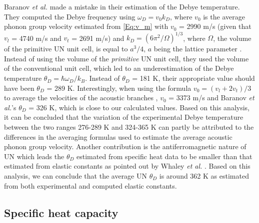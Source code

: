 \documentclass[preprint, 12pt]{elsarticle}
\begin{document}
Baranov \textit{et al.} \cite{Baranov2013} made a mistake in their estimation of the Debye temperature. They computed the Debye frequency using $\omega_D = v_0 k_D$, where $v_0$ is the average phonon group velocity estimated from \cref{Eq:v_m}  with $v_0$ = 2990 m/s (given that $v_l$ = 4740 m/s and $v_t$ = 2691 m/s) and $k_D = \left( 6 \pi^2 / \Omega \right)^{1/3}$, where $\Omega$, the volume of the primitive UN unit cell, is equal to $a^3/4$, $a$ being the lattice parameter \cite{Sellan2010}. Instead of using the volume of the \textit{primitive} UN unit cell, they used the volume of the conventional unit cell, which led to an underestimation of the Debye temperature $\theta_D = \hbar \omega_D / k_B$. Instead of $\theta_D$ = 181 K, their appropriate value should have been $\theta_D$ = 289 K. Interestingly, when using the formula $v_0 = \left( v_l + 2 v_t \right)/3$ to average the velocities of the acoustic branches \cite{Sellan2010}, $v_0$ = 3373 m/s and Baranov \textit{et al.}'s $\theta_D$ = 326 K, which is close to our calculated values. Based on this analysis, it can be concluded that the variation of the experimental Debye temperature between the two ranges 276-289 K and 324-365 K can partly be attributed to the differences in the averaging formulas used to estimate the average acoustic phonon group velocity. Another contribution is the antiferromagnetic nature of UN which leads the $\theta_D$ estimated from specific heat data to be smaller than that estimated from elastic constants as pointed out by Whaley \textit{et al.} \cite{Whaley1969}. Based on this analysis, we can conclude that the average UN $\theta_D$ is around 362 K as estimated from both experimental and computed elastic constants.



\subsection{Specific heat capacity}
\end{document}
